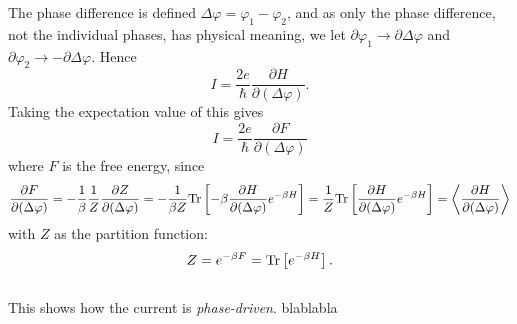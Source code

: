 The phase difference is defined $\Delta \varphi = \varphi_1 - \varphi_2$, and as only the phase difference, not the individual phases, has physical meaning, we let $\partial \varphi_1 \rightarrow \partial \Delta \varphi$ and $\partial \varphi_2 \rightarrow - \partial \Delta \varphi$. Hence
\begin{equation}
    I = \frac{2e}{\hbar}\frac{\partial H}{\partial (\Delta \varphi)}.
\end{equation}
Taking the expectation value of this gives
\begin{equation}
    I = \frac{2e}{\hbar}\frac{\partial F}{\partial (\Delta \varphi)}
    \label{JosephsonCurrent}
\end{equation}
where $F$ is the free energy, since
\begin{equation}
    \frac{\partial F}{\partial (\Delta \varphi)} = -\frac{1}{\beta}\frac{1}{Z}\frac{\partial Z}{\partial (\Delta \varphi)} = -\frac{1}{\beta Z}\mathrm{Tr}\left[-\beta\frac{\partial H}{\partial (\Delta \varphi) }e^{-\beta H}\right] = \frac{1}{Z}\mathrm{Tr}\left[\frac{\partial H}{\partial (\Delta \varphi)}e^{-\beta H}\right] = \left\langle\frac{\partial H}{\partial (\Delta \varphi)}\right\rangle
\end{equation}
with $Z$ as the partition function:
\begin{equation}
    Z = e^{-\beta F} = \mathrm{Tr}\left[e^{-\beta H} \right].
\end{equation}
\\
This shows how the current is \textit{phase-driven}. blablabla

